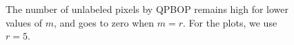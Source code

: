 \documentclass[runningheads]{llncs}
\begin{document}
\begin{figure}[!htp]
\center
{}%
%
\caption{The number of unlabeled pixels by QPBOP remains high for lower values of $m$, and goes to zero when $m=r$. For the plots, we use $r=5$.}
\end{figure}
\end{document}
